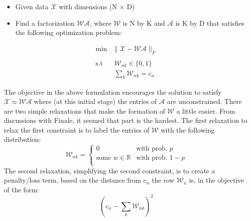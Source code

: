 \documentclass[submit]{harvardml}
\newcommand{\R}{\mathbb{R}}
\newcommand{\X}{\mathcal{X}}
\newcommand{\W}{\mathcal{W}}
\newcommand{\A}{\mathcal{A}}
\begin{document}
\begin{itemize}
\item Given data $\X$ with dimensions (N $\times$ D)
\item Find a factorization $\W\A$, where $\W$ is N by K and $\A$ is K by D that satisfies the following optimization problem:
\end{itemize}

\begin{displaymath}
        \begin{aligned}
        \min &\|\X-\W\A\|_F\\
        &\ \\
        \text{s.t} &\; \W_{nk}\in \{0,1\}\\
                   &\; \sum_k \W_{nk} = c_n
    \end{aligned}
\end{displaymath}

The objective in the above formulation encourages the solution to satisfy $\X\approx\W\A$ where (at this initial stage) the entries of $\A$ are unconstrained. There are two simple relaxations that make the formation of $\W$ a little easier. From discussions with Finale, it seemed that part is the hardest. The first relaxation to relax the first constraint is to label the entries of $\W$ with the following distribution:
\[ \W_{nk} = \begin{cases} 
      0 & \text{with prob. } p \\
      \text{some } w \in\R & \text{with prob. } 1-p \\
   \end{cases}
\] 
\noindent The second relaxation, simplifying the second constraint, is to create a penalty/loss term, based on the distance from $c_n$ the row $\W_n$ is, in the objective of the form: $$(c_n-\sum_k \W_{nk})^2$$
\end{document}
